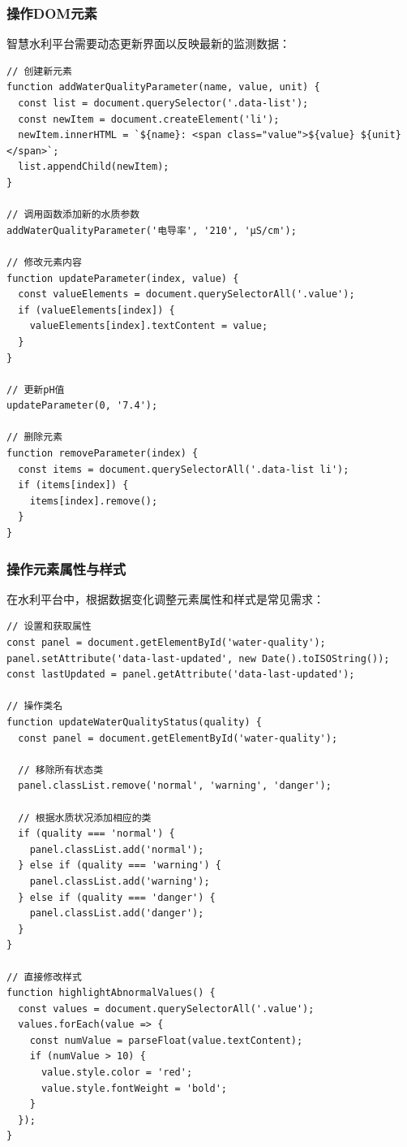 \subsubsection{操作DOM元素}\label{ux64cdux4f5cdomux5143ux7d20}

智慧水利平台需要动态更新界面以反映最新的监测数据：

\begin{lstlisting}
// 创建新元素
function addWaterQualityParameter(name, value, unit) {
  const list = document.querySelector('.data-list');
  const newItem = document.createElement('li');
  newItem.innerHTML = `${name}: <span class="value">${value} ${unit}</span>`;
  list.appendChild(newItem);
}

// 调用函数添加新的水质参数
addWaterQualityParameter('电导率', '210', 'μS/cm');

// 修改元素内容
function updateParameter(index, value) {
  const valueElements = document.querySelectorAll('.value');
  if (valueElements[index]) {
    valueElements[index].textContent = value;
  }
}

// 更新pH值
updateParameter(0, '7.4');

// 删除元素
function removeParameter(index) {
  const items = document.querySelectorAll('.data-list li');
  if (items[index]) {
    items[index].remove();
  }
}
\end{lstlisting}

\subsubsection{操作元素属性与样式}\label{ux64cdux4f5cux5143ux7d20ux5c5eux6027ux4e0eux6837ux5f0f}

在水利平台中，根据数据变化调整元素属性和样式是常见需求：

\begin{lstlisting}
// 设置和获取属性
const panel = document.getElementById('water-quality');
panel.setAttribute('data-last-updated', new Date().toISOString());
const lastUpdated = panel.getAttribute('data-last-updated');

// 操作类名
function updateWaterQualityStatus(quality) {
  const panel = document.getElementById('water-quality');
  
  // 移除所有状态类
  panel.classList.remove('normal', 'warning', 'danger');
  
  // 根据水质状况添加相应的类
  if (quality === 'normal') {
    panel.classList.add('normal');
  } else if (quality === 'warning') {
    panel.classList.add('warning');
  } else if (quality === 'danger') {
    panel.classList.add('danger');
  }
}

// 直接修改样式
function highlightAbnormalValues() {
  const values = document.querySelectorAll('.value');
  values.forEach(value => {
    const numValue = parseFloat(value.textContent);
    if (numValue > 10) {
      value.style.color = 'red';
      value.style.fontWeight = 'bold';
    }
  });
}
\end{lstlisting}

